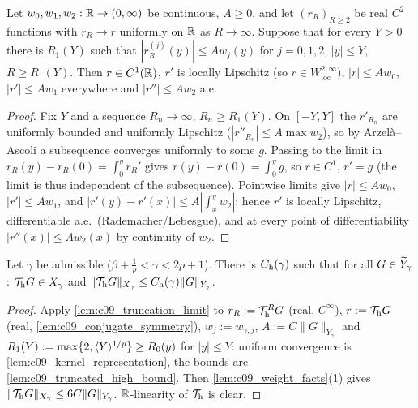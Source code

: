 \begin{lemma}
  \label{lem:c09_truncation_limit}
  Let $w_0,w_1,w_2:\mathbb{R}\to(0,\infty)$ be continuous, $A\ge0$, and let $(r_R)_{R\ge2}$ be real $C^2$ functions with $r_R\to r$ uniformly on $\mathbb{R}$ as $R\to\infty$.
  Suppose that for every $Y>0$ there is $R_1(Y)$ such that $|r_R^{(j)}(y)|\le Aw_j(y)$ for $j=0,1,2$, $|y|\le Y$, $R\ge R_1(Y)$. Then $r\in C^1(\mathbb{R})$, $r'$ is locally
  Lipschitz (so $r\in W^{2,\infty}_{\mathrm{loc}}$), $|r|\le Aw_0$, $|r'|\le Aw_1$ everywhere and $|r''|\le Aw_2$ a.e.
\end{lemma}
\begin{proof}
  Fix $Y$ and a sequence $R_n\to\infty$, $R_n\ge R_1(Y)$. On $[-Y,Y]$ the $r'_{R_n}$ are uniformly bounded and uniformly Lipschitz ($|r''_{R_n}|\le A\max w_2$),
  so by Arzel\`a--Ascoli a subsequence converges uniformly to some $g$. Passing to the limit in $r_{R}(y)-r_R(0)=\int_0^yr_R'$ gives $r(y)-r(0)=\int_0^yg$, so $r\in C^1$,
  $r'=g$ (the limit is thus independent of the subsequence). Pointwise limits give $|r|\le Aw_0$, $|r'|\le Aw_1$, and
  $|r'(y)-r'(x)|\le A|\int_x^yw_2|$; hence $r'$ is locally Lipschitz, differentiable a.e.\ (Rademacher/Lebesgue), and at every point of differentiability
  $|r''(x)|\le Aw_2(x)$ by continuity of $w_2$.
\end{proof}

\begin{proposition}
  \label{prop:linear_high_frequency}
  Let $\gamma$ be admissible ($\beta+\frac1p<\gamma<2p+1$). There is $C_{\textup{h}}(\gamma)$ such that for all $G\in\widetilde{Y}_\gamma$: $\mathcal{T}_{\textup{h}}G\in X_\gamma$ and
  $\|\mathcal{T}_{\textup{h}}G\|_{X_\gamma}\le C_{\textup{h}}(\gamma)\|G\|_{Y_\gamma}$.
\end{proposition}
\begin{proof}
  Apply \cref{lem:c09_truncation_limit} to $r_R:=\mathcal{T}^R_{\textup{h}}G$ (real, $C^\infty$), $r:=\mathcal{T}_{\textup{h}}G$ (real, \cref{lem:c09_conjugate_symmetry}), $w_j:=w_{\gamma,j}$,
  $A:=C\|G\|_{Y_\gamma}$ and $R_1(Y):=\max\{2,\langle Y \rangle^{1/p}\}\ge R_0(y)$ for $|y|\le Y$: uniform convergence is \cref{lem:c09_kernel_representation}, the bounds are
  \cref{lem:c09_truncated_high_bound}. Then \cref{lem:c09_weight_facts}(1) gives $\|\mathcal{T}_{\textup{h}}G\|_{X_\gamma}\le6C\|G\|_{Y_\gamma}$. $\mathbb{R}$-linearity of $\mathcal{T}_{\textup{h}}$ is clear.
\end{proof}

